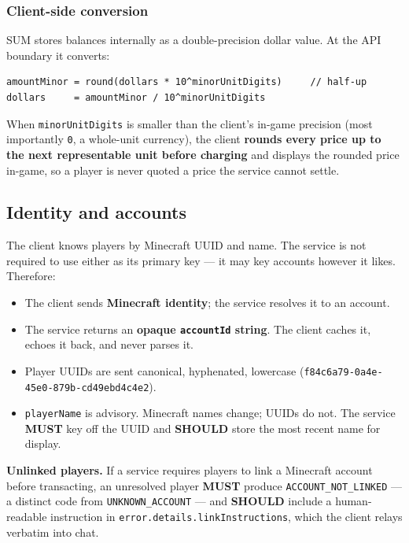 \documentclass[11pt,a4paper]{article}
\newcommand{\code}[1]{\texttt{\small #1}}
\newcommand{\req}{\textbf{MUST}}
\newcommand{\rec}{\textbf{SHOULD}}
\begin{document}
\subsubsection*{Client-side conversion}

SUM stores balances internally as a double-precision dollar value. At the API boundary it converts:

\begin{lstlisting}[style=http]
amountMinor = round(dollars * 10^minorUnitDigits)     // half-up
dollars     = amountMinor / 10^minorUnitDigits
\end{lstlisting}

When \code{minorUnitDigits} is smaller than the client's in-game precision (most importantly
\code{0}, a whole-unit currency), the client \textbf{rounds every price up to the next
representable unit before charging} and displays the rounded price in-game, so a player is never
quoted a price the service cannot settle.

\subsection{Identity and accounts}
\label{sec:identity}

The client knows players by Minecraft UUID and name. The service is not required to use either as
its primary key --- it may key accounts however it likes. Therefore:

\begin{itemize}
\item The client sends \textbf{Minecraft identity}; the service resolves it to an account.
\item The service returns an \textbf{opaque \code{accountId} string}. The client caches it, echoes
      it back, and never parses it.
\item Player UUIDs are sent canonical, hyphenated, lowercase
      (\code{f84c6a79-0a4e-45e0-879b-cd49ebd4c4e2}).
\item \code{playerName} is advisory. Minecraft names change; UUIDs do not. The service \req{} key
      off the UUID and \rec{} store the most recent name for display.
\end{itemize}

\textbf{Unlinked players.} If a service requires players to link a Minecraft account before
transacting, an unresolved player \req{} produce \code{ACCOUNT\_NOT\_LINKED} --- a distinct code
from \code{UNKNOWN\_ACCOUNT} --- and \rec{} include a human-readable instruction in
\code{error.details.linkInstructions}, which the client relays verbatim into chat.
\end{document}
